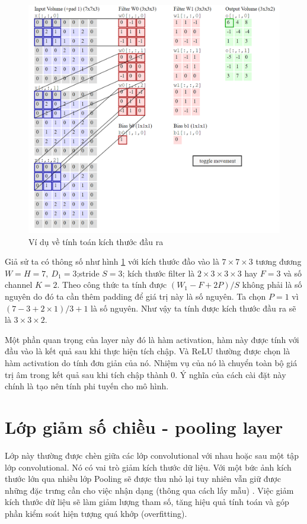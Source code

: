 \begin{center}
\begin{figure}[htp]
	\begin{center}
		\includegraphics[scale=0.2]{chap4/image/slide1_1.png}
	\end{center}
	\caption{Ví dụ về tính toán kích thước đầu ra}
	\label{fig:minhhoatichchap2}
\end{figure}
\end{center}

Giả sử ta có thông số như hình \ref{fig:minhhoatichchap2} với kích thước đầo vào là $7\times7\times3$ tương đương $W=H=7,~ D_1=3$;stride $S=3$; kích thước filter là $2\times 3\times 3 \times 3$ hay $F=3$ và số channel $K=2$. Theo công thức ta tính được $(W_1 - F+ 2P)/S$ không phải là số nguyên do đó ta cần thêm padding để giá trị này là số nguyên. Ta chọn $P=1$ vì $(7-3+2\times 1)/3 +1$ là số nguyên. Như vậy ta tính được kích thước đầu ra sẽ là $3\times3\times2$. \par
Một phần quan trọng của layer này đó là hàm activation, hàm này được tính với đầu vào là kết quả sau khi thực hiện tích chập. Và ReLU thường được chọn là hàm activation do tính đơn giản của nó. Nhiệm vụ của nó là chuyển toàn bộ giá trị âm trong kết quả sau khi tích chập thành 0. Ý nghĩa của cách cài đặt này chính là tạo nên tính phi tuyến cho mô hình. 
\section{Lớp giảm số chiều -  pooling layer}
Lớp này thường được chèn giữa các lớp convolutional với nhau hoặc sau một tập lớp convolutional. Nó có vai trò giảm kích thước dữ liệu. Với một bức ảnh kích thước lớn qua nhiều lớp Pooling sẽ được thu nhỏ lại tuy nhiên vẫn giữ được những đặc trưng cần cho việc nhận dạng (thông qua cách lấy mẫu) . Việc giảm kích thước dữ liệu sẽ làm giảm lượng tham số, tăng hiệu quả tính toán và góp phần kiểm soát hiện tượng quá khớp (overfitting).\\


